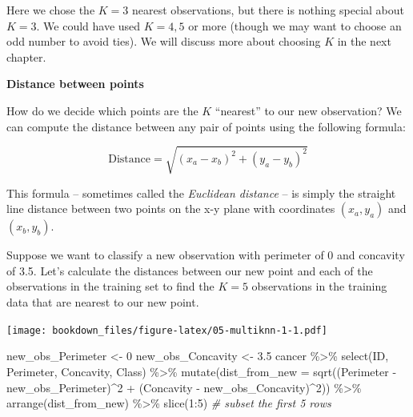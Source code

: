 \documentclass[
]{krantz}
\makeatletter
\newenvironment{Shaded}{\begin{snugshade}}{\end{snugshade}}
\newcommand{\AttributeTok}[1]{\textcolor[rgb]{0.61,0.61,0.61}{#1}}
\newcommand{\CommentTok}[1]{\textcolor[rgb]{0.37,0.37,0.37}{\textit{#1}}}
\newcommand{\DecValTok}[1]{\textcolor[rgb]{0.06,0.06,0.06}{#1}}
\newcommand{\FloatTok}[1]{\textcolor[rgb]{0.06,0.06,0.06}{#1}}
\newcommand{\FunctionTok}[1]{\textcolor[rgb]{0,0,0}{#1}}
\newcommand{\NormalTok}[1]{#1}
\newcommand{\OtherTok}[1]{\textcolor[rgb]{0.37,0.37,0.37}{#1}}
\newcommand{\SpecialCharTok}[1]{\textcolor[rgb]{0,0,0}{#1}}
\renewenvironment{quote}{\begin{VF}}{\end{VF}}
\newenvironment{kframe}{%
\medskip{}
\setlength{\fboxsep}{.8em}
 \def\at@end@of@kframe{}%
 \ifinner\ifhmode%
  \def\at@end@of@kframe{\end{minipage}}%
  \begin{minipage}{\columnwidth}%
 \fi\fi%
 \def\FrameCommand##1{\hskip\@totalleftmargin \hskip-\fboxsep
 \colorbox{shadecolor}{##1}\hskip-\fboxsep
     \hskip-\linewidth \hskip-\@totalleftmargin \hskip\columnwidth}%
 \MakeFramed {\advance\hsize-\width
   \@totalleftmargin\z@ \linewidth\hsize
   \@setminipage}}%
 {\par\unskip\endMakeFramed%
 \at@end@of@kframe}
\renewenvironment{Shaded}{\begin{kframe}}{\end{kframe}}
\makeatother
\begin{document}
Here we chose the \(K=3\) nearest observations, but there is nothing special
about \(K=3\). We could have used \(K=4, 5\) or more (though we may want to choose
an odd number to avoid ties). We will discuss more about choosing \(K\) in the
next chapter.

\textbf{Distance between points}

How do we decide which points are the \(K\) ``nearest'' to our new observation? We
can compute the distance between any pair of points using the following
formula:

\[\mathrm{Distance} = \sqrt{(x_a -x_b)^2 + (y_a - y_b)^2}\]

\begin{quote}
This formula -- sometimes called the \emph{Euclidean distance} -- is simply the straight line distance between two points on the x-y plane with coordinates \((x_a, y_a)\) and \((x_b, y_b)\).
\end{quote}

Suppose we want to classify a new observation with perimeter of 0 and
concavity of 3.5. Let's calculate the distances
between our new point and each of the observations in the training set to find
the \(K=5\) observations in the training data that are nearest to our new point.

\texttt{[image: bookdown\_files/figure-latex/05-multiknn-1-1.pdf]}

\begin{Shaded}
\begin{Highlighting}[]
\NormalTok{new\_obs\_Perimeter }\OtherTok{\textless{}{-}} \DecValTok{0}
\NormalTok{new\_obs\_Concavity }\OtherTok{\textless{}{-}} \FloatTok{3.5}
\NormalTok{cancer }\SpecialCharTok{\%\textgreater{}\%}
  \FunctionTok{select}\NormalTok{(ID, Perimeter, Concavity, Class) }\SpecialCharTok{\%\textgreater{}\%}
  \FunctionTok{mutate}\NormalTok{(}\AttributeTok{dist\_from\_new =} \FunctionTok{sqrt}\NormalTok{((Perimeter }\SpecialCharTok{{-}}\NormalTok{ new\_obs\_Perimeter)}\SpecialCharTok{\^{}}\DecValTok{2} \SpecialCharTok{+}\NormalTok{ (Concavity }\SpecialCharTok{{-}}\NormalTok{ new\_obs\_Concavity)}\SpecialCharTok{\^{}}\DecValTok{2}\NormalTok{)) }\SpecialCharTok{\%\textgreater{}\%}
  \FunctionTok{arrange}\NormalTok{(dist\_from\_new) }\SpecialCharTok{\%\textgreater{}\%}
  \FunctionTok{slice}\NormalTok{(}\DecValTok{1}\SpecialCharTok{:}\DecValTok{5}\NormalTok{) }\CommentTok{\# subset the first 5 rows}
\end{Highlighting}
\end{Shaded}
\end{document}
